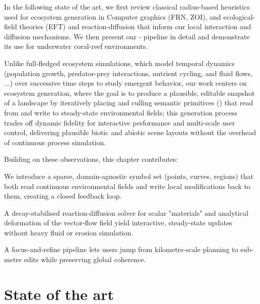 In the following state of the art, we first review classical radius-based heuristics used for ecosystem generation in Computer graphics (FRN, ZOI), and ecological-field theories (EFT) and reaction-diffusion that inform our local interaction and diffusion mechanisms. We then present our - pipeline in detail and demonstrate its use for underwater coral-reef environments. %

Unlike full-fledged ecosystem simulations, which model temporal dynamics (population growth, predator-prey interactions, nutrient cycling, and fluid flows, ...) over successive time steps to study emergent behavior, our work centers on ecosystem generation, where the goal is to produce a plausible, editable snapshot of a landscape by iteratively placing and culling semantic primitives () that read from and write to steady-state environmental fields; this generation process trades off dynamic fidelity for interactive performance and multi-scale user control, delivering plausible biotic and abiotic scene layouts without the overhead of continuous process simulation.

Building on these observations, this chapter contributes:
\begin{Itemize}
    \Item{}  We introduce a sparse, domain-agnostic symbol set (points, curves, regions) that both read continuous environmental fields and write local modifications back to them, creating a closed feedback loop.

    \Item{}  A decay-stabilised reaction-diffusion solver for scalar "materials" and analytical deformation of the vector-flow field yield interactive, steady-state updates without heavy fluid or erosion simulation.

    \Item{}  A focus-and-refine pipeline lets users jump from kilometre-scale planning to sub-metre edits while preserving global coherence. %

\end{Itemize}






\section{State of the art}
\label{sec:env-obj-related-works}

